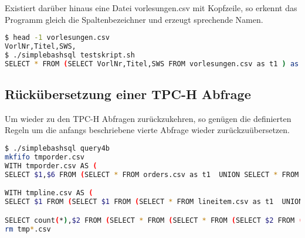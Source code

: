 Existiert darüber hinaus eine Datei vorlesungen.csv mit Kopfzeile, so erkennt das Programm gleich die Spaltenbezeichner und erzeugt sprechende Namen.
\begin{lstlisting}[language=Bash]
$ head -1 vorlesungen.csv
VorlNr,Titel,SWS,
$ ./simplebashsql testskript.sh
SELECT * FROM (SELECT VorlNr,Titel,SWS FROM vorlesungen.csv as t1 ) as t1  ORDER BY Titel
\end{lstlisting}

\subsection{Rückübersetzung einer TPC-H Abfrage}
Um wieder zu den TPC-H Abfragen zurückzukehren, so genügen die definierten Regeln um die anfangs beschriebene vierte Abfrage wieder zurückzuübersetzen.
\begin{lstlisting}[language=Bash]
$ ./simplebashsql query4b
mkfifo tmporder.csv
WITH tmporder.csv AS (
SELECT $1,$6 FROM (SELECT * FROM orders.csv as t1  UNION SELECT * FROM (SELECT * FROM orders.tbl as t1  ORDER BY $1,$1) as t1union1 ) as t1  WHERE (true) AND ($5<'1993-10-01') AND ($5>='1993-07-01')  )

WITH tmpline.csv AS (
SELECT $1 FROM (SELECT $1 FROM (SELECT * FROM lineitem.csv as t1  UNION SELECT * FROM (SELECT * FROM lineitem.tbl as t1  ORDER BY $1,$1) as t1union1 ) as t1  WHERE (true) AND ($12<$13) ) as t1  GROUP BY $1 )

SELECT count(*),$2 FROM (SELECT * FROM (SELECT * FROM (SELECT $2 FROM (SELECT $1,$2,$3,$4,$5,$6,$7,$8,$9 FROM tmporder.csv as t1, tmpline.csv as t2  WHERE (t1.$1=t2.$10) ) as t1 ) as t1 ) as t1 ) as t1  GROUP BY $2
rm tmp*.csv
\end{lstlisting}


